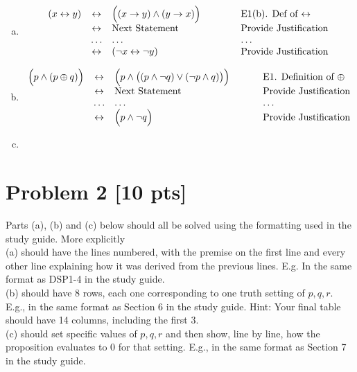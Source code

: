 \documentclass[12pt]{article}
\begin{document}
\begin{enumerate}[(a)]
    \item
    $$
    \begin{array}{lclcl}
    (x \leftrightarrow y) & \leftrightarrow &  \Bigl( (x \rightarrow y) \wedge (y \rightarrow x)\Bigr)& \hspace*{.3in}
            & \mbox{E1(b). Def of $\leftrightarrow$}\\
    & \leftrightarrow & \mbox{Next Statement}           &  & \mbox{Provide Justification}\\
    &  \ldots         &       \ldots                    &  & \ldots     \\       
    & \leftrightarrow & (\neg x \leftrightarrow \neg y) &  & \mbox{Provide Justification}
    \end{array}
    $$


\item 
$$
\begin{array}{lclcl}
    \Bigl(p \wedge (p \oplus q)\Bigr)
    & \leftrightarrow &  \Bigl( p \wedge \bigl((p \wedge \neg q) \vee (\neg p \wedge q)\bigr)\Bigr)  & 
     \hspace*{.2in} & \mbox{E1. Definition of $\oplus$}\\
    & \leftrightarrow &  \mbox{Next Statement}           &  & \mbox{Provide Justification}\\
    &  \ldots         &       \ldots                    &  & \ldots     \\     
    & \leftrightarrow &  \Bigl(   p \wedge \neg q\Bigr)&
                                     \hspace*{.2in} & \mbox{Provide Justification}
\end{array}
$$


    \item 
\end{enumerate}




\newpage
\section*{\textbf{Problem 2} [10 pts]}
Parts (a), (b) and (c) below should all be solved using the formatting used in the study guide.
More explicitly\\
(a) should have the lines numbered,  with the premise on the first line and every other line explaining how it was derived from the previous lines.  E.g. In the same format as DSP1-4 in the study guide. \\
(b) should have 8 rows, each one corresponding to one truth setting of $p,q,r.$ E.g., in the same format as Section 6 in the study guide. Hint: Your final table should have 14 columns, including the first 3.
\\(c) should set specific values of $p,q,r$ and then show, line by line, how the proposition evaluates to $0$ for that setting. E.g., in the same format as Section 7 in the study guide.
\end{document}
